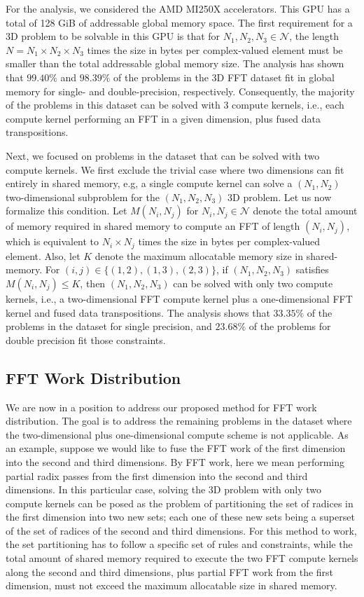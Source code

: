 \documentclass{gtac}
\theoremstyle{problemstyle}
\begin{document}
For the analysis, we considered the AMD MI250X accelerators. This GPU has a total of 128 GiB of addressable global memory space. The first requirement for a 3D problem to be solvable in this GPU is that for $N_1,N_2,N_3 \in \mathcal{N}$, the length $N=N_1 \times N_2 \times N_3$ times the size in bytes per complex-valued element must be smaller than the total addressable global memory size. The analysis has shown that $99.40\%$ and $98.39\%$ of the problems in the 3D FFT dataset fit in global memory for single- and double-precision, respectively. Consequently, the majority of the problems in this dataset can be solved with 3 compute kernels, i.e., each compute kernel performing an FFT in a given dimension, plus fused data transpositions.

Next, we focused on problems in the dataset that can be solved with two compute kernels. We first exclude the trivial case where two dimensions can fit entirely in shared memory, e.g, a single compute kernel can solve a $(N_1,N_2)$ two-dimensional subproblem for the $(N_1,N_2,N_3)$ 3D problem. Let us now formalize this condition. Let $M(N_i,N_j)$ for $N_i,N_j \in \mathcal{N}$ denote the total amount of memory required in shared memory to compute an FFT of length $(N_i,N_j)$, which is equivalent to $N_i \times N_j$ times the size in bytes per complex-valued element. Also, let $K$ denote the maximum allocatable memory size in shared-memory. For $(i,j) \in \bigl \{ (1,2), (1,3), (2,3) \bigr \}$, if $(N_1,N_2,N_3)$ satisfies $M(N_i, N_j) \leq K$, then $(N_1,N_2,N_3)$ can be solved with only two compute kernels, i.e., a two-dimensional FFT compute kernel plus a one-dimensional FFT kernel and fused data transpositions. The analysis shows that $33.35 \%$ of the problems in the dataset for single precision, and $23.68 \%$ of the problems for double precision fit those constraints.

\subsection{FFT Work Distribution}

We are now in a position to address our proposed method for FFT work distribution. The goal is to address the remaining problems in the dataset where the two-dimensional plus one-dimensional compute scheme is not applicable. As an example, suppose we would like to fuse the FFT work of the first dimension into the second and third dimensions. By FFT work, here we mean performing partial radix passes from the first dimension into the second and third dimensions. In this particular case, solving the 3D problem with only two compute kernels can be posed as the problem of partitioning the set of radices in the first dimension into two new sets; each one of these new sets being a superset of the set of radices of the second and third dimensions. For this method to work, the set partitioning has to follow a specific set of rules and constraints, while the total amount of shared memory required to execute the two FFT compute kernels along the second and third dimensions, plus partial FFT work from the first dimension, must not exceed the maximum allocatable size in shared memory.
\end{document}
